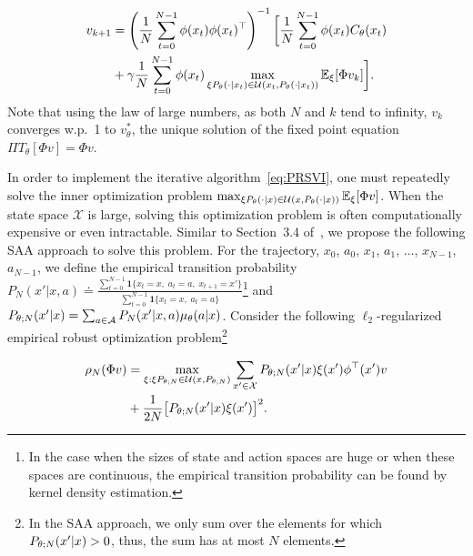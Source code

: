 %
\begin{align}
v_{k+1}&=\left(\frac{1}{N}\sum_{t=0}^{N-1} \phi(x_t)\phi(x_t)^{\top}\right)^{-1}\bigg[\frac{1}{N}\sum_{t=0}^{N-1}\phi(x_t) C_{\theta}(x_t)\nonumber\\
&+\gamma\frac{1}{N}\sum_{t=0}^{N-1} \phi(x_t)\max_{\xi P_\theta(\cdot |x_t)\in {\mathcal{U}}(x_t,P_\theta(\cdot |x_t))} \mathbb E_{\xi}[\Phi v_k ]\bigg].
\label{eq:PRSVI}
\end{align}
%
Note that using the law of large numbers, as both $N$ and $k$ tend to infinity, $v_k$ converges w.p.~1 to $v_\theta^*$, the unique solution of the fixed point equation $\Pi T_{\theta} [\Phi v]=\Phi v$.


In order to implement the iterative algorithm~\eqref{eq:PRSVI}, one must repeatedly solve the inner optimization problem $\max_{\xi P_\theta(\cdot |x)\in {\mathcal{U}}(x,P_\theta(\cdot |x))} \mathbb E_{\xi}[\Phi v ]$. When the state space $\mathcal X$ is large, solving this optimization problem is often computationally expensive or even intractable. Similar to Section~3.4 of~\citet{tamar2014robust}, we propose the following SAA approach to solve this problem. For the trajectory, $x_0$, $a_0$, $x_1$, $a_1$, $\ldots$, $x_{N-1}$, $a_{N-1}$, we define the empirical transition probability $P_N(x'|x,a) \doteq \frac{\sum_{t=0}^{N-1}\mathbf{1}\{x_t=x,\;a_t=a,\;x_{t+1}=x'\}}{\sum_{t=0}^{N-1}\mathbf{1}\{x_t=x,\;a_t=a\}}$\footnote{In the case when the sizes of state and action spaces are huge or when these spaces are continuous, the empirical transition probability can be found by kernel density estimation.} and $P_{\theta;N}(x'|x)=\sum_{a\in\mathcal A}P_N(x'|x,a)\mu_\theta(a|x)$. Consider the following $\ell_2$-regularized empirical robust optimization problem\footnote{In the SAA approach, we only sum over the elements for which $P_{\theta;N}(x'|x)>0$, thus, the sum has at most $N$ elements.}

\vspace{-0.2in}
\begin{small}
\begin{align}
\rho_N(\Phi v)&=\max_{\xi: \xi P_{\theta;N} \in {\mathcal{U}}(x,P_{\theta;N})} \sum_{x'\in\mathcal X} P_{\theta;N}(x'|x) \xi(x')\phi^\top(x')v \nonumber \\
&+ \frac{1}{2N}\big[P_{\theta;N}(x'|x) \xi(x')\big]^2.
\label{eq:empirical-PRSVI}
\end{align}
\end{small}
\vspace{-0.2in}

